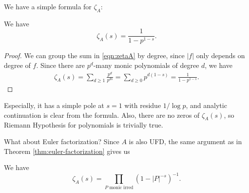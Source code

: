 We have a simple formula for $\zeta_A$:
\begin{proposition}
    \label{prop:zetaA}
    We have
    \begin{equation}
        \zeta_A(s) = \frac{1}{1 - p^{1 - s}}.
        \label{eqn:zetaA_formula}
    \end{equation}
\end{proposition}
\begin{proof}
    We can group the sum in \eqref{eqn:zetaA} by degree, since $|f|$ only depends on degree of $f$.
    Since there are $p^d$-many monic polynomials of degree $d$, we have
    \begin{align*}
        \zeta_A(s) = \sum_{d \ge 1} \frac{p^d}{p^{ds}} = \sum_{d \ge 0} p^{d(1 - s)} = \frac{1}{1 - p^{1 - s}}.
    \end{align*}
\end{proof}
Especially, it has a simple pole at $s = 1$ with residue $1 / \log p$, and analytic continuation is clear from the formula.
Also, there are no zeros of $\zeta_A(s)$, so Riemann Hypothesis for polynomials is trivially true.

What about Euler factorization?
Since $A$ is also UFD, the same argument as in Theorem \ref{thm:euler-factorization} gives us
\begin{theorem}
    \label{thm:euler-factorization-poly}
    We have
    \begin{equation}
        \zeta_A(s) = \prod_{P\text{ monic irred}} (1 - |P|^{-s})^{-1}.
        \label{eqn:euler-factorization-poly}
    \end{equation}
\end{theorem}

